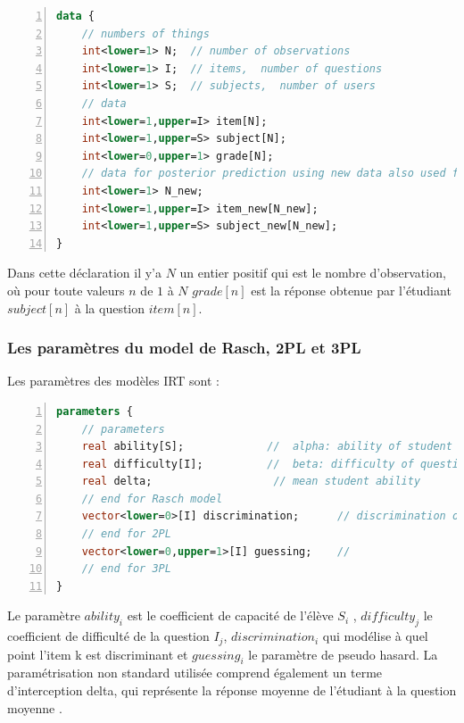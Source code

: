 \begin{lstlisting}[language=Stan,basicstyle=\scriptsize, frame=l,framesep=4.5mm,framexleftmargin=2.5mm,tabsize=2,numbers=left,fillcolor=\color{blueforest!70},rulecolor=\color{blueforest},numberstyle=\normalfont\tiny\color{white}]
data {
	// numbers of things
	int<lower=1> N;  // number of observations
	int<lower=1> I;  // items,  number of questions  
	int<lower=1> S;  // subjects,  number of users 
	// data
	int<lower=1,upper=I> item[N];
	int<lower=1,upper=S> subject[N];
	int<lower=0,upper=1> grade[N];
	// data for posterior prediction using new data also used for Cross-validation
	int<lower=1> N_new;
	int<lower=1,upper=I> item_new[N_new];
	int<lower=1,upper=S> subject_new[N_new];
}
\end{lstlisting}
Dans cette déclaration il y’a \(\displaystyle N \) un entier positif qui est le nombre d’observation, où pour toute valeurs \(\displaystyle n \) de \(\displaystyle 1 \) à \(\displaystyle N \) \(\displaystyle grade[n] \) est la réponse obtenue par l’étudiant \(\displaystyle subject[n] \) à la question \(\displaystyle item[n] \).

\subsubsection{Les paramètres du model de Rasch, 2PL et 3PL}
Les paramètres des modèles IRT sont :

\begin{lstlisting}[language=Stan,basicstyle=\scriptsize, frame=l,framesep=4.5mm,framexleftmargin=2.5mm,tabsize=2,numbers=left,fillcolor=\color{blueforest!70},rulecolor=\color{blueforest},numberstyle=\normalfont\tiny\color{white}]
parameters {
	// parameters
	real ability[S];             //  alpha: ability of student
	real difficulty[I];          //  beta: difficulty of question
	real delta;                   // mean student ability
	// end for Rasch model
	vector<lower=0>[I] discrimination;      // discrimination of question
	// end for 2PL
	vector<lower=0,upper=1>[I] guessing;    //
	// end for 3PL
}
\end{lstlisting}
Le paramètre  \(\displaystyle ability_{i} \) est le coefficient de capacité de l'élève \(\displaystyle S_{i} \) , \(\displaystyle difficulty_{j} \) le coefficient de difficulté de la question \(\displaystyle I_{j} \), \(\displaystyle discrimination_{i} \) qui modélise à quel point l’item k est discriminant et \(\displaystyle guessing_{i} \) le paramètre de pseudo hasard. La paramétrisation non standard utilisée comprend également un terme d'interception delta, qui représente la réponse moyenne de l'étudiant à la question moyenne \cite{data_analysis_irt}.

